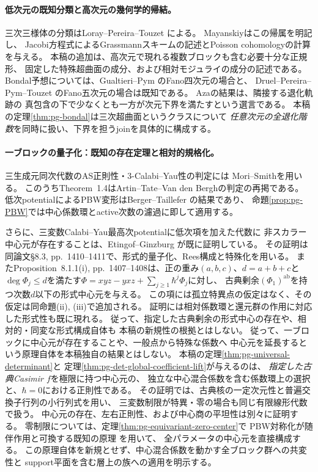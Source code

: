 \paragraph{低次元の既知分類と高次元の幾何学的帰結。}
三次三様体の分類はLoray--Pereira--Touzet
\cite[Theorems~7.1, 9.1]{LPTPoissonCubic}による。
Mayanskiy\cite[Theorem~1]{PMayanskiy}はこの帰属を明記し、
Jacobi方程式によるGrassmannスキームの記述とPoisson cohomologyの計算を与える。
本稿の追加は、高次元で現れる複数ブロックも含む必要十分な正規形、
固定した特殊超曲面の成分、および相対モジュライの成分の記述である。
Bondal予想については、Gualtieri--Pym
\cite[Theorem~7.13]{BondalGualtieriPym}のFano四次元の場合と、
Druel--Pereira--Pym--Touzet
\cite[Corollary~1.3]{BondalDruelPereiraPymTouzet}のFano五次元の場合は既知である。
Aza\cite[Theorem~1.3]{BondalAza}の結果は、隣接する退化軌跡の
真包含の下で少なくとも一方が次元下界を満たすという選言である。
本稿の定理\ref{thm:pg-bondal}は三次超曲面というクラスについて
\emph{任意次元の全退化階数}を同時に扱い、下界を担うjoinを具体的に構成する。

\paragraph{一ブロックの量子化：既知の存在定理と相対的規格化。}
三生成元同次代数のAS正則性・3-Calabi--Yau性の判定には
Mori--Smith\cite[Theorems~1.4, 4.2]{PMoriSmith}を用いる。
このうちTheorem~1.4はArtin--Tate--Van den Berghの判定の再掲である。
低次potentialによるPBW変形はBerger--Taillefer
\cite[Theorem~1.1(i), p.~242]{PBergerTaillefer}の結果であり、
命題\ref{prop:pg-PBW}では中心係数環とactive次数の濾過に即して適用する。

さらに、三変数Calabi--Yau最高次potentialに低次項を加えた代数に
非スカラー中心元が存在することは、Etingof--Ginzburg
\cite[Theorem~3.3.2(ii), p.~1385]{EG}が既に証明している。
その証明は同論文\S8.3, pp.~1410--1411で、形式的量子化、Rees構成と特殊化を用いる。
またProposition~8.1.1(i), pp.~1407--1408は、正の重み$(a,b,c)$、$d=a+b+c$と
$\deg\Phi_j\le d$を満たす$\Phi=xyz-yxz+\sum_{j\ge1}\hbar^j\Phi_j$に対し、
古典剰余$(\Phi_1)^{\mathrm{ab}}$を持つ次数$d$以下の形式中心元を与える。
この項には孤立特異点の仮定はなく、その仮定は同命題(ii), (iii)で追加される。
証明には相対係数環と還元群の作用に対応した形式性も既に現れる。
従って、指定した古典剰余の形式中心の存在や、相対的・同変な形式構成自体も
本稿の新規性の根拠とはしない。
従って、一ブロックに中心元が存在することや、一般点から特殊な係数へ
中心元を延長するという原理自体を本稿独自の結果とはしない。
本稿の定理\ref{thm:pg-universal-determinant}と
定理\ref{thm:pg-det-global-coefficient-lift}が与えるのは、
\emph{指定した古典Casimir $f$}を極限に持つ中心元の、
独立な中心混合係数を含む係数環上の選択と、$\hbar=0$における正則性である。
その証明では、古典核の一定次元性と普遍交換子行列の小行列式を用い、
三変数制限が特異・零の場合も同じ有限線形代数で扱う。
中心元の存在、左右正則性、および中心商の平坦性は別々に証明する。
零制限については、定理\ref{thm:pg-equivariant-zero-center}で
PBW対称化が随伴作用と可換する既知の原理
\cite[Corollaries~13.7--13.8, p.~75]{PEtingofLie}を用いて、
全パラメータの中心元を直接構成する。
この原理自体を新規とせず、中心混合係数を動かす全ブロック群への共変性と
support平面を含む層上の族への適用を明示する。

